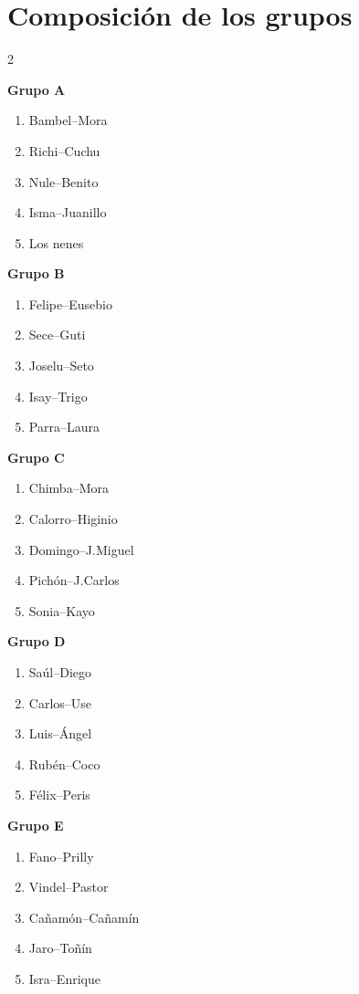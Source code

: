 \documentclass[11pt,a4paper]{article}
\begin{document}
\section{Composición de los grupos}

\begin{multicols}{2}

\textbf{Grupo A}
\begin{enumerate}[nosep]
    \item Bambel--Mora
    \item Richi--Cuchu
    \item Nule--Benito
    \item Isma--Juanillo
    \item Los nenes
\end{enumerate}

\textbf{Grupo B}
\begin{enumerate}[nosep]
    \item Felipe--Eusebio
    \item Sece--Guti
    \item Joselu--Seto
    \item Isay--Trigo
    \item Parra--Laura
\end{enumerate}

\textbf{Grupo C}
\begin{enumerate}[nosep]
    \item Chimba--Mora
    \item Calorro--Higinio
    \item Domingo--J.Miguel
    \item Pichón--J.Carlos
    \item Sonia--Kayo
\end{enumerate}

\columnbreak

\textbf{Grupo D}
\begin{enumerate}[nosep]
    \item Saúl--Diego
    \item Carlos--Use
    \item Luis--Ángel
    \item Rubén--Coco
    \item Félix--Peris
\end{enumerate}

\textbf{Grupo E}
\begin{enumerate}[nosep]
    \item Fano--Prilly
    \item Vindel--Pastor
    \item Cañamón--Cañamín
    \item Jaro--Toñín
    \item Isra--Enrique
\end{enumerate}

\end{multicols}
\end{document}
